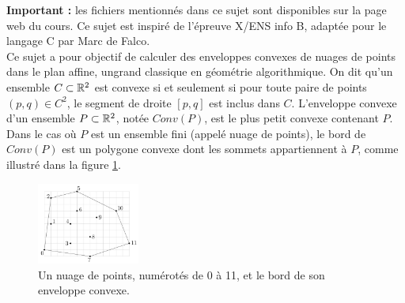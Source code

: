 \documentclass[a4paper,french,bookmarks]{article}
\begin{document}

\textbf{Important :} les fichiers mentionnés dans ce sujet sont disponibles sur la page web du cours. Ce sujet est inspiré de l’épreuve X/ENS info B, adaptée pour le langage C par Marc de Falco.\\

Ce sujet a pour objectif de calculer des enveloppes convexes de nuages de points dans le plan affine, ungrand classique en géométrie algorithmique. On dit qu’un ensemble $C \subset \mathbb{R}^2$ est convexe si et seulement si pour toute paire de points $(p, q) \in C^2$, le segment de droite $[p, q]$ est inclus dans $C$. L’enveloppe convexe d’un ensemble $P \subset \mathbb{R}^2$, notée $Conv(P)$, est le plus petit convexe contenant $P$. Dans le cas où $P$ est un ensemble fini (appelé nuage de points), le bord de $Conv(P)$ est un polygone convexe dont les sommets appartiennent à $P$, comme illustré dans la figure \ref{fig:fig1}.

\begin{figure}[!ht]
    \centering
    \includegraphics[width=0.3\textwidth]{dm1/figure1.jpg}
    \caption{Un nuage de points, numérotés de 0 à 11, et le bord de son enveloppe convexe.}
    \label{fig:fig1}
\end{figure}
\end{document}

